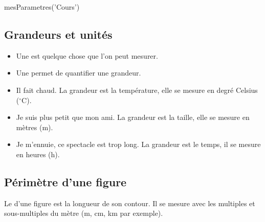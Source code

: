 \documentclass{classe-tex3R}
\begin{document}

\begin{luacode}
  mesParametres('Cours')
  
\end{luacode}
\parametrage

\subsection{Grandeurs et unités}


\begin{definition}
  \begin{itemize}
    \item   Une  est quelque chose que l'on peut mesurer.
    \item Une  permet de quantifier une grandeur.
  \end{itemize}
\end{definition}


\begin{exemple}
    \begin{itemize}
      \item Il fait chaud. La grandeur est la température, elle se mesure en degré Celsius ($^\circ$C).
      \item Je suis plus petit que mon ami. La grandeur est la taille, elle se mesure en mètres (m).
      \item Je m'ennuie, ce spectacle est trop long. La grandeur est le temps, il se mesure en heures (h).
    \end{itemize}
\end{exemple}

\sautdiapo



\subsection{Périmètre d'une figure}


\begin{definition}
  Le  d'une figure est la longueur de son contour. Il se mesure avec les multiples et sous-multiples du mètre (m, cm, km par exemple).
\end{definition}
\end{document}
